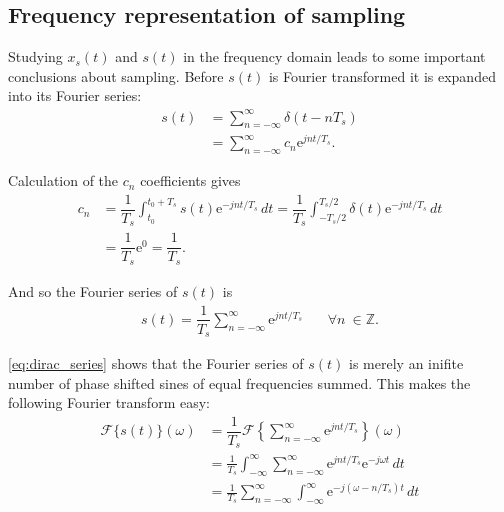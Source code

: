\subsection{Frequency representation of sampling}
Studying $x_s(t)$ and $s(t)$ in the frequency domain leads to some important conclusions about sampling. Before $s(t)$ is Fourier transformed it is expanded into its Fourier series:
\begin{align*}
s(t)&=\sum_{n=-\infty}^{\infty}\delta(t-nT_s) \\
&=\sum_{n=-\infty}^{\infty}c_n\mathrm{e}^{j nt/T_s}.
\end{align*}

Calculation of the $c_n$ coefficients gives
\begin{align*}
c_n &= \dfrac{1}{T_s} \int_{t_0}^{t_0+T_s} \! s(t) \mathrm{e}^{-jnt/T_s} \, dt = \dfrac{1}{T_s} \int_{-T_s/2}^{T_s/2} \! \delta(t) \mathrm{e}^{-jnt/T_s} \, dt \\
&= \dfrac{1}{T_s}\mathrm{e}^0 = \dfrac{1}{T_s}.
\end{align*}

And so the Fourier series of $s(t)$ is
\begin{align}\label{eq:dirac_series}
s(t) = \dfrac{1}{T_s} \sum_{n=-\infty}^{\infty} \mathrm{e}^{jnt/T_s} \phantom{mm} \forall n \ \in \mathbb{Z}.
\end{align}

\eqref{eq:dirac_series} shows that the Fourier series of $s(t)$ is merely an inifite number of phase shifted sines of equal frequencies summed. This makes the following Fourier transform easy:
\begin{align} \label{eq:fourier_comb1}
\mathcal{F}\{s(t)\}(\omega) &= \dfrac{1}{T_s} \mathcal{F}\left\{\sum_{n=-\infty}^{\infty} \mathrm{e}^{jnt/T_s} \right\} (\omega) \nonumber \\
&= \frac{1}{T_s} \int_{-\infty}^{\infty} \! \sum_{n=-\infty}^{\infty} \mathrm{e}^{jnt/T_s} \mathrm{e}^{-j\omega t} \, dt \nonumber \\
&= \frac{1}{T_s} \sum_{n=-\infty}^{\infty} \int_{-\infty}^{\infty} \! \mathrm{e}^{-j(\omega-n/T_s)t} \, dt
\end{align}

